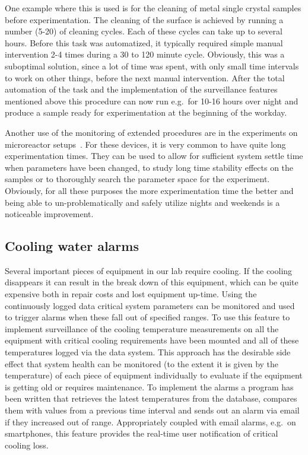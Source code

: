 One example where this is used is for the cleaning of metal single crystal
samples before experimentation. The cleaning of the surface is achieved by
running a number (5-20) of cleaning cycles. Each of these cycles can take up to
several hours. Before this task was automatized, it typically required simple
manual intervention 2-4 times during a 30 to 120 minute cycle. Obviously, this
was a suboptimal solution, since a lot of time was spent, with only small time
intervals to work on other things, before the next manual intervention. After
the total automation of the task and the implementation of the surveillance
features mentioned above this procedure can now run e.g.\ for 10-16 hours over
night and produce a sample ready for experimentation at the beginning of the
workday.

Another use of the monitoring of extended procedures are in the
experiments on microreactor setups~\cite{Henriksen2009}. For these devices,
it is very common to have quite long experimentation times. They can be used to
allow for sufficient system settle time when parameters have been changed, to
study long time stability effects on the samples or to thoroughly search the
parameter space for the experiment. Obviously, for all these purposes the more
experimentation time the better and being able to un-problematically and safely
utilize nights and weekends is a noticeable improvement.

\subsection{Cooling water alarms}\label{sec:cooling_water_alarms}

Several important pieces of equipment in our lab require cooling. If the
cooling disappears it can result in the break down of this equipment, which can
be quite expensive both in repair costs and lost equipment up-time. Using the
continuously logged data critical system parameters can be monitored and used
to trigger alarms when these fall out of specified ranges. To use this feature
to implement surveillance of the cooling temperature measurements on all the
equipment with critical cooling requirements have been mounted and all of these
temperatures logged via the data system. This approach has the desirable side
effect that system health can be monitored (to the extent it is given by the
temperature) of each piece of equipment individually to evaluate if the
equipment is getting old or requires maintenance. To implement the alarms a
program has been written that retrieves the latest temperatures from the
database, compares them with values from a previous time interval and sends out
an alarm via email if they increased out of range. Appropriately coupled with
email alarms, e.g.\ on smartphones, this feature provides the real-time user
notification of critical cooling loss.
